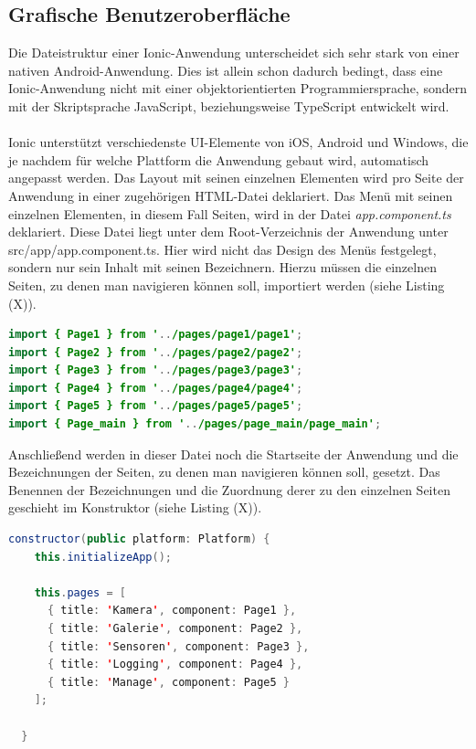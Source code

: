 \subsection*{Grafische Benutzeroberfläche}

Die Dateistruktur einer Ionic-Anwendung unterscheidet sich sehr stark von einer nativen Android-Anwendung. Dies ist allein schon dadurch bedingt, dass eine Ionic-Anwendung nicht mit einer objektorientierten Programmiersprache, sondern mit der Skriptsprache JavaScript, beziehungsweise TypeScript entwickelt wird.     
\\
\\
Ionic unterstützt verschiedenste UI-Elemente von iOS, Android und Windows, die je nachdem für welche Plattform die Anwendung gebaut wird, automatisch angepasst werden. Das Layout mit seinen einzelnen Elementen wird pro Seite der Anwendung in einer zugehörigen HTML-Datei deklariert. Das Menü mit seinen einzelnen Elementen, in diesem Fall Seiten, wird in der Datei \textit{app.component.ts} deklariert. Diese Datei liegt unter dem Root-Verzeichnis der Anwendung unter src/app/app.component.ts. Hier wird nicht das Design des Menüs festgelegt, sondern nur sein Inhalt mit seinen Bezeichnern. Hierzu müssen die einzelnen Seiten, zu denen man navigieren können soll, importiert werden (siehe Listing (X)). 

\begin{lstlisting}[caption=Import der einzelnen Seiten für die Navigation in der Datei \textit{app.component.ts}, label=lst:app.component.tsImports, language=Java]
import { Page1 } from '../pages/page1/page1';
import { Page2 } from '../pages/page2/page2';
import { Page3 } from '../pages/page3/page3';
import { Page4 } from '../pages/page4/page4';
import { Page5 } from '../pages/page5/page5';
import { Page_main } from '../pages/page_main/page_main';
\end{lstlisting} 

Anschließend werden in dieser Datei noch die Startseite der Anwendung und die Bezeichnungen der Seiten, zu denen man navigieren können soll, gesetzt. Das Benennen der Bezeichnungen und die Zuordnung derer zu den einzelnen Seiten geschieht im Konstruktor (siehe Listing (X)).

\begin{lstlisting}[caption=Setzen der Bezeichnungen der einzelnen Seiten für die Navigation, label=lst:Navigationsbezeichnungen, language=Java]
constructor(public platform: Platform) {
    this.initializeApp();

    this.pages = [
      { title: 'Kamera', component: Page1 },
      { title: 'Galerie', component: Page2 },
      { title: 'Sensoren', component: Page3 },
      { title: 'Logging', component: Page4 },
      { title: 'Manage', component: Page5 }
    ];

  }
\end{lstlisting} 

